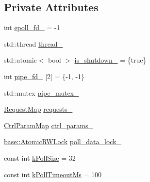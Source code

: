 \subsection*{Private Attributes}
\begin{DoxyCompactItemize}
\item 
int \hyperlink{classapollo_1_1cyber_1_1io_1_1Poller_af669bb62157becf9016f69df5b1b5660}{epoll\-\_\-fd\-\_\-} = -\/1
\item 
std\-::thread \hyperlink{classapollo_1_1cyber_1_1io_1_1Poller_a2145143a3849794f4faf3aa7c5c0b841}{thread\-\_\-}
\item 
std\-::atomic$<$ bool $>$ \hyperlink{classapollo_1_1cyber_1_1io_1_1Poller_a5792d1208ae12538fe5b26d40fd6ca45}{is\-\_\-shutdown\-\_\-} = \{true\}
\item 
int \hyperlink{classapollo_1_1cyber_1_1io_1_1Poller_aa75b020f05c88884f277c2f2e7d7e6be}{pipe\-\_\-fd\-\_\-} \mbox{[}2\mbox{]} = \{-\/1, -\/1\}
\item 
std\-::mutex \hyperlink{classapollo_1_1cyber_1_1io_1_1Poller_a3df124c7d788692895df721bc51cc70e}{pipe\-\_\-mutex\-\_\-}
\item 
\hyperlink{classapollo_1_1cyber_1_1io_1_1Poller_a46cf3c8b1cd0c34c0daf7dd076cddc63}{Request\-Map} \hyperlink{classapollo_1_1cyber_1_1io_1_1Poller_a23832294a91e3659fd279314aa351612}{requests\-\_\-}
\item 
\hyperlink{classapollo_1_1cyber_1_1io_1_1Poller_a8b5069a91f056c7b473bcfd02ff2aaad}{Ctrl\-Param\-Map} \hyperlink{classapollo_1_1cyber_1_1io_1_1Poller_a4f0f2b3d4c68325fc3cefb0a4cdddfa9}{ctrl\-\_\-params\-\_\-}
\item 
\hyperlink{classapollo_1_1cyber_1_1base_1_1AtomicRWLock}{base\-::\-Atomic\-R\-W\-Lock} \hyperlink{classapollo_1_1cyber_1_1io_1_1Poller_a3f852093b8de045b394577a4c8a833eb}{poll\-\_\-data\-\_\-lock\-\_\-}
\item 
const int \hyperlink{classapollo_1_1cyber_1_1io_1_1Poller_a68e2ded7a858f416c9bd248e61af1b66}{k\-Poll\-Size} = 32
\item 
const int \hyperlink{classapollo_1_1cyber_1_1io_1_1Poller_ad4c45237b9d3db1d4efb8d1cc7fe5a6d}{k\-Poll\-Timeout\-Ms} = 100
\end{DoxyCompactItemize}



